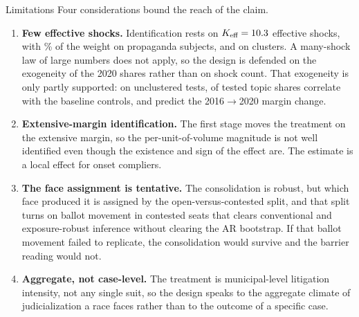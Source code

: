 
\begin{frame}{Limitations}
\hypertarget{src:limitations}{}
\small
Four considerations bound the reach of the claim.
\medskip
\begin{enumerate}\itemsep4pt
  \item \textbf{Few effective shocks.} Identification rests on $K_{\text{eff}}=10.3$ effective shocks, with \RotPropagandaPct\% of the weight on propaganda subjects, and on \NClusters{} clusters. A many-shock law of large numbers  does not apply, so the design is defended on the exogeneity of the 2020 shares rather than on shock count. That exogeneity is only partly supported: on unclustered tests, \GpsCovFail{} of \GpsNTopics{} tested topic shares correlate with the baseline controls, and \GpsMarginPtFail{} predict the 2016$\to$2020 margin change.
  \item \textbf{Extensive-margin identification.} The first stage moves the treatment on the extensive margin, so the per-unit-of-volume magnitude is not well identified even though the existence and sign of the effect are. The estimate is a local effect for onset compliers.
  \item \textbf{The face assignment is tentative.} The consolidation is robust, but which face produced it is assigned by the open-versus-contested split, and that split turns on ballot movement in contested seats that clears conventional and exposure-robust inference without clearing the AR bootstrap. If that ballot movement failed to replicate, the consolidation would survive and the barrier reading would not.
  \item \textbf{Aggregate, not case-level.} The treatment is municipal-level litigation intensity, not any single suit, so the design speaks to the aggregate climate of judicialization a race faces rather than to the outcome of a specific case.
\end{enumerate}
\end{frame}
